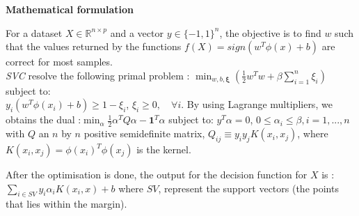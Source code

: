 \documentclass[twocolumn]{article}
\newcommand{\R}{\mathbb{R}}
\begin{document}
\textbf{Mathematical formulation}

For a dataset $X \in \R^{n \times p}$ and a vector $y \in \{-1, 1\}^n$, the objective is to find $w$ such that the values returned by the functions $f(X) = sign(w^T\phi(x) + b)$ are correct for most samples.\\
\textit{SVC} resolve the following primal problem : \(\displaystyle
\min_{w, b, \boldsymbol{\xi}} \left( \frac{1}{2} w^T w + \beta \sum_{i=1}^{n} \xi_i \right)
\) 
subject to:\\
\( y_i (w^T \phi(x_i) + b) \geq 1 - \xi_i\), \(\xi_i \geq 0, \quad \forall i\).
By using Lagrange multipliers, we obtains the dual :\(\displaystyle \min_{\alpha} \frac{1}{2} \alpha^T Q \alpha - \mathbf{1}^T \alpha
\) subject to: \(y^T \alpha = 0\), \(0 \leq \alpha_i \leq \beta, i=1,...,n\) with $Q$ an $n$ by $n$ positive semidefinite matrix, $Q_{ij} \equiv y_iy_jK(x_i, x_j)$, where $K(x_i, x_j) = \phi(x_i)^T\phi(x_j)$ is the kernel. 

After the optimisation is done, the output for the decision function for $X$ is :\(\displaystyle \sum_{i\in SV} y_i\alpha_i K(x_i, x) + b\)
where $SV$, represent the support vectors (the points that lies within the margin).
\end{document}
